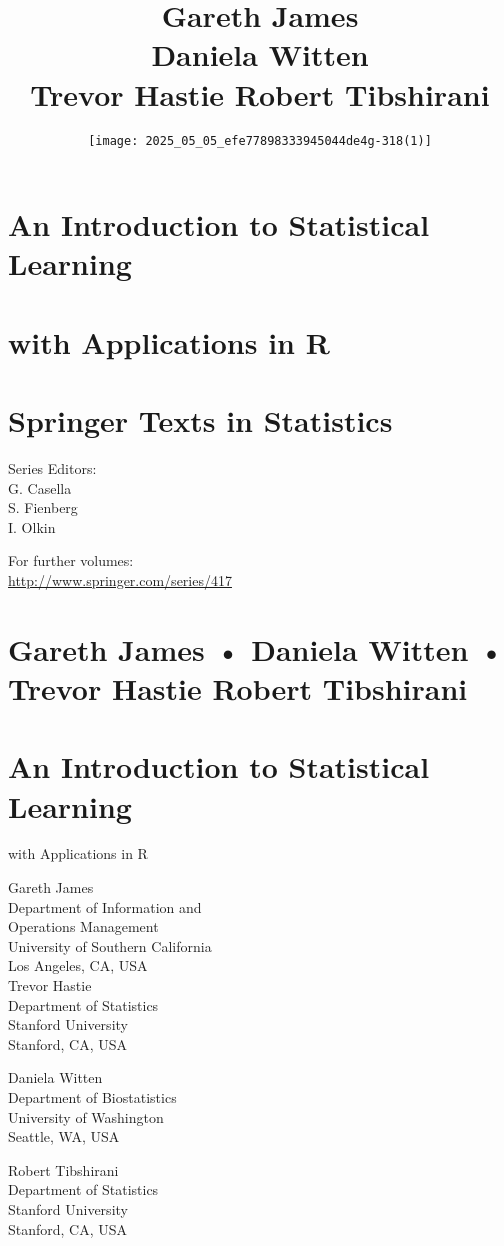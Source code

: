 \documentclass[10pt]{article}
\title{Gareth James \\
 Daniela Witten \\
 Trevor Hastie Robert Tibshirani }
\author{\texttt{[image: 2025\_05\_05\_efe77898333945044de4g-318(1)]}
}
\date{}
\begin{document}
\maketitle
\section*{An Introduction to Statistical Learning }
\section*{with Applications in R}
\section*{Springer Texts in Statistics}
Series Editors:\\
G. Casella\\
S. Fienberg\\
I. Olkin

For further volumes:\\
\href{http://www.springer.com/series/417}{http://www.springer.com/series/417}

\section*{Gareth James • Daniela Witten • Trevor Hastie Robert Tibshirani }
\section*{An Introduction to Statistical Learning }
with Applications in R

Gareth James\\
Department of Information and\\
Operations Management\\
University of Southern California\\
Los Angeles, CA, USA\\
Trevor Hastie\\
Department of Statistics\\
Stanford University\\
Stanford, CA, USA

Daniela Witten\\
Department of Biostatistics\\
University of Washington\\
Seattle, WA, USA

Robert Tibshirani\\
Department of Statistics\\
Stanford University\\
Stanford, CA, USA
\end{document}

